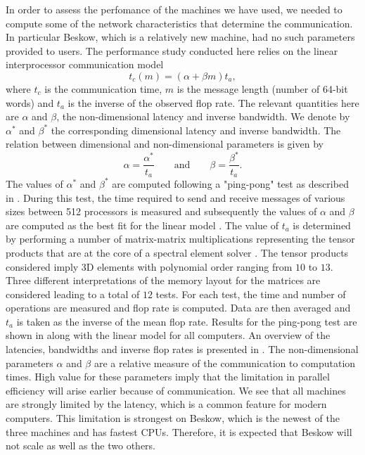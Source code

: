 \documentclass{sig-alternate}
\begin{document}
In order to assess the perfomance of the machines we have used, we needed to compute some of the network characteristics that determine the communication. In particular Beskow, which is a relatively new machine, had no such parameters provided to users. 
The performance study conducted here relies on the linear interprocessor communication  model
\begin{equation}
 t_c(m) = (\alpha + \beta m) t_a,\label{eqn:lincomm}
\end{equation}
where $t_c$ is the communication time, $m$ is the message length (number of
64-bit words) and $t_a$ is the inverse of the observed flop rate. The relevant
quantities here are $\alpha$ and $\beta$, the non-dimensional latency and inverse
 bandwidth. We denote by $\alpha^*$ and $\beta^*$ the corresponding dimensional 
latency and inverse bandwidth. The relation between dimensional and non-dimensional parameters is given by
\begin{equation*}
\alpha = \frac{\alpha^*}{t_a} \qquad \text{and} \qquad \beta = \frac{\beta^*}{t_a}.
\end{equation*}
The values of $\alpha^*$ and $\beta^*$ are computed following a "ping-pong" test 
as described in \cite{fischer:scaling}. During this test, the time required to 
send and receive messages of various sizes between 512 processors is measured 
and subsequently the values of $\alpha$ and $\beta$ are computed as the best fit 
for the linear model . The value of $t_a$ is determined by 
performing a number of matrix-matrix multiplications representing the tensor products
 that are at the core of a spectral element solver \cite{fischer:hom}. The tensor
 products considered imply 3D elements with polynomial order ranging from $10$ to $13$.
 Three different interpretations of the memory layout for the matrices are considered 
leading to a total of $12$ tests. For each test, the time and number of operations are
 measured and flop rate is computed. Data are then averaged and $t_a$ is taken as the
 inverse of the mean flop rate. Results for the ping-pong test are shown in 
 along with the linear model for all computers. An overview 
of the latencies, bandwidths and inverse flop rates is presented in 
. The non-dimensional parameters $\alpha$ and $\beta$ are 
a relative measure of the communication to computation times. High value for these
parameters imply that the limitation in parallel efficiency will arise earlier because 
of communication. We see that all machines are strongly limited by the latency,
which is a common feature for modern computers. This limitation is strongest on
Beskow, which is the newest of the three machines and has fastest CPUs. Therefore,
it is expected that Beskow will not scale as well as the two others.
\end{document}
